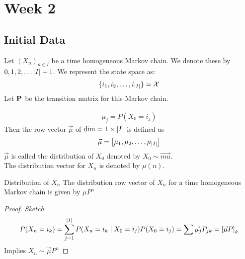 \documentclass[12pt,a4paper]{article}
\begin{document}
\newpage 

\section{Week 2}
\subsection{Initial Data}
Let $(X_n)_{n\in I}$ be a time homogeneous Markov chain. We denote these by $0, 1, 2, \ldots \abs{I} - 1$. We represent the state space as:
\begin{align*}
\{i_1, i_2, \ldots, i_{\abs{I}}\} = \mathcal{X}
\end{align*}
Let $\bf P$ be the transition matrix for this Markov chain. 
\begin{defn}
\begin{align*}
\mu_j = P(X_0 = i_j)
\end{align*}
Then the row vector $\vec{\mu}$ of $\dim = 1 \times \abs{I}$ is defined as 
\begin{align*}
\vec{\mu} = \left[\mu_1, \mu_2, \ldots, \mu_{\abs{I}}\right]
\end{align*} 
$\vec{\mu}$ is called the distribution of $X_0$ denoted by $X_0 \sim \vec{mu}$.\\
The distribution vector for $X_n$ is denoted by $\mu(n)$. 
\end{defn}


\begin{thm}{Distribution of $X_n$}
The distribution row vector of $X_n$ for a time homogeneous Markov chain is given by $\mu P^n$  
\end{thm}
\begin{proof}
\textit{Sketch}. 
\begin{align*}
P(X_n = i_k) = \sum\limits_{j=1}^{\abs{I}}P(X_n = i_k \;\vert\; X_0 = i_j)P(X_0 = i_j) = \sum \vec{\mu_j} P_{jk} = \left[\vec{\mu}P\right]_k
\end{align*}
Implies $X_n \sim \vec{\mu}P^n$
\end{proof}
\newpage
\end{document}
